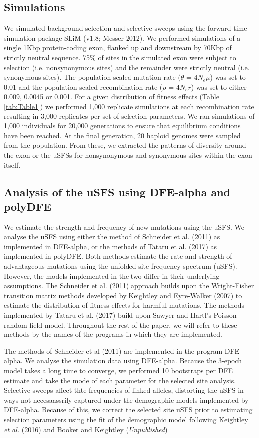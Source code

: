 \documentclass[11pt]{article}
\begin{document}
	\subsection*{Simulations}
	We simulated background selection and selective sweeps using the forward-time simulation package SLiM (v1.8; Messer 2012). We performed simulations of a single 1Kbp protein-coding exon, flanked up and downstream by 70Kbp of strictly neutral sequence. 75\% of sites in the simulated exon were subject to selection (i.e. nonsynonymous sites) and the remainder were strictly neutral (i.e. synonymous sites). The population-scaled mutation rate ($\theta$ = \emph{$4N_{e}\mu$}) was set to 0.01 and the population-scaled recombination rate ($\rho$ = \emph{$4N_{e}r$}) was set to either 0.009, 0.0045 or 0.001. For a given distribution of fitness effects (Table \ref{tab:Table1}) we performed 1,000 replicate simulations at each recombination rate resulting in 3,000 replicates per set of selection parameters. We ran simulations of 1,000 individuals for 20,000 generations to ensure that equilibrium conditions have been reached. At the final generation, 20 haploid genomes were sampled from the population. From these, we extracted the patterns of diversity around the exon or the uSFSs for nonsynonymous and synonymous sites within the exon itself.


	\subsection*{Analysis of the uSFS using DFE-alpha and polyDFE}

	We estimate the strength and frequency of new mutations using the uSFS. We analyse the uSFS using either the method of Schneider et al. (2011) as implemented in DFE-alpha, or the methods of Tataru et al. (2017) as implemented in polyDFE. Both methods estimate the rate and strength of advantageous mutations using the unfolded site frequency spectrum (uSFS). However, the models implemented in the two differ in their underlying assumptions. The Schneider et al. (2011) approach builds upon the Wright-Fisher transition matrix methods developed by Keightley and Eyre-Walker (2007) to estimate the distribution of fitness effects for harmful mutations. The methods implemented by Tataru et al. (2017) build upon Sawyer and Hartl’s Poisson random field model.
Throughout the rest of the paper, we will refer to these methods by the names of the programs in which they are implemented.


		The methods of Schneider et al (2011) are implemented in the program DFE-alpha. We analyse the simulation data using DFE-alpha. Because the 3-epoch model takes a long time to converge, we performed 10 bootstraps per DFE estimate and take the mode of each parameter for the selected site analysis. Selective sweeps affect thte frequencies of linked alleles, distorting the uSFS in ways not necesaassrily captured under the demographic models implemented by DFE-alpha. Because of this, we correct the selected site uSFS prior to estimating selection parameters using the fit of the demographic model following Keightley \textit{et al.} (2016) and Booker and Keightley (\textit{Unpublished})
			
\end{document}
